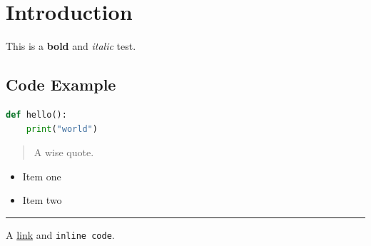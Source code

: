 \section{Introduction}\label{introduction}
This is a \textbf{bold} and \emph{italic} test.

\subsection{Code Example}\label{code}
\begin{lstlisting}[language=python]
def hello():
    print("world")
\end{lstlisting}
\begin{quote}
A wise quote.

\end{quote}
\begin{itemize}
\tightlist
\item Item one

\item Item two

\end{itemize}

\noindent\rule{\textwidth}{0.4pt}

A \href{https://example.com}{link} and \texttt{inline code}.

